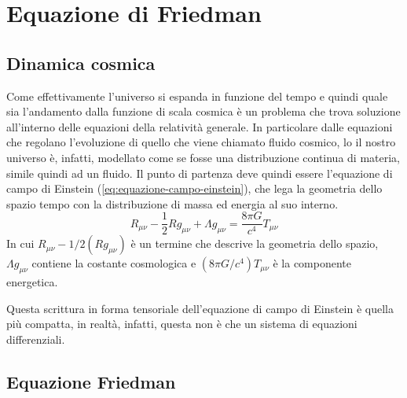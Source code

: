\section{Equazione di Friedman}\label{sec:equazione-friedman}
\subsection{Dinamica cosmica}\label{sec:dinamica-cosmica}

Come effettivamente l'universo si espanda in funzione del tempo e quindi quale sia l'andamento dalla funzione di scala cosmica è un problema che trova soluzione all'interno delle equazioni della relatività generale. In particolare dalle equazioni che regolano l'evoluzione di quello che viene chiamato fluido cosmico, lo il nostro universo è, infatti, modellato come se fosse una distribuzione continua di materia, simile quindi ad un fluido. Il punto di partenza deve quindi essere l'equazione di campo di Einstein (\ref{eq:equazione-campo-einstein}), che lega la geometria dello spazio tempo con la distribuzione di massa ed energia al suo interno.
\begin{equation}\label{eq:equazione-campo-einstein}
    R_{\mu \nu} -\frac{1}{2}R g_{\mu \nu} + \Lambda g_{\mu \nu} = \frac{8\pi G}{c^4}T_{\mu \nu}
\end{equation}
In cui $R_{\mu \nu}-{1}/{2}(R g_{\mu \nu})$  è un termine che descrive la geometria dello spazio, $\Lambda g_{\mu \nu}$ contiene la costante cosmologica e $({8\pi G}/{c^4})T_{\mu \nu}$ è la componente energetica.

Questa scrittura in forma tensoriale dell'equazione di campo di Einstein è quella più compatta, in realtà, infatti, questa non è che un sistema di equazioni differenziali.
\subsection{Equazione Friedman}\label{sec:sub-equazione-friedman}

